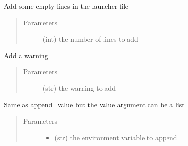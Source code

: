 \documentclass[a4paper,10pt,english]{sphinxmanual}
\begin{document}
\begin{fulllineitems}
\begin{fulllineitems}
\begin{quote}
\begin{description}
\end{description}\end{quote}

\end{fulllineitems}


\begin{fulllineitems}
\label{\detokenize{apidoc_src/src:src.fileEnviron.LauncherFileEnviron.add_line}}
Add some empty lines in the launcher file
\begin{quote}\begin{description}
\item[{Parameters}] \leavevmode
{} \textendash{} (int) the number of lines to add

\end{description}\end{quote}

\end{fulllineitems}


\begin{fulllineitems}
\label{\detokenize{apidoc_src/src:src.fileEnviron.LauncherFileEnviron.add_warning}}
Add a warning
\begin{quote}\begin{description}
\item[{Parameters}] \leavevmode
{} \textendash{} (str) the warning to add

\end{description}\end{quote}

\end{fulllineitems}


\begin{fulllineitems}
\label{\detokenize{apidoc_src/src:src.fileEnviron.LauncherFileEnviron.append}}
Same as append\_value but the value argument can be a list
\begin{quote}\begin{description}
\item[{Parameters}] \leavevmode\begin{itemize}
\item {} 
 \textendash{} (str) the environment variable to append


\end{itemize}
\end{description}
\end{quote}
\end{fulllineitems}
\end{fulllineitems}
\end{document}
